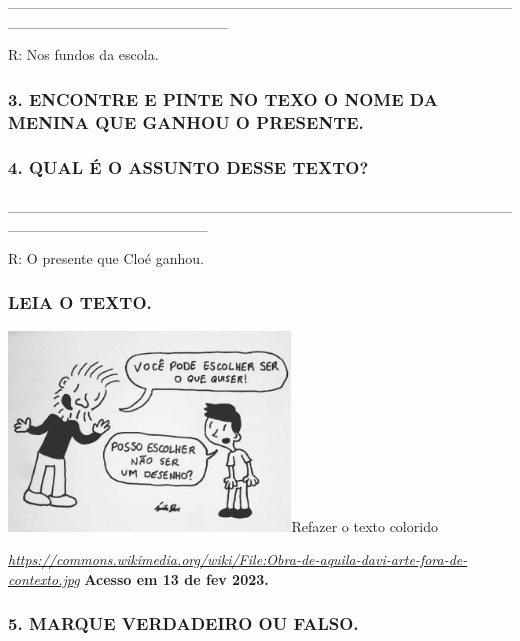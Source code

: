 \_\_\_\_\_\_\_\_\_\_\_\_\_\_\_\_\_\_\_\_\_\_\_\_\_\_\_\_\_\_\_\_\_\_\_\_\_\_\_\_\_\_\_\_\_\_\_\_\_\_\_\_\_\_\_\_\_\_\_\_\_\_\_\_\_\_\_\_\_

R: Nos fundos da escola.

\subsubsection{3. ENCONTRE E PINTE NO TEXO O NOME DA MENINA QUE GANHOU O
PRESENTE.}\label{encontre-e-pinte-no-texo-o-nome-da-menina-que-ganhou-o-presente.}

\subsubsection{4. QUAL É O ASSUNTO DESSE
TEXTO?}\label{qual-uxe9-o-assunto-desse-texto}

\_\_\_\_\_\_\_\_\_\_\_\_\_\_\_\_\_\_\_\_\_\_\_\_\_\_\_\_\_\_\_\_\_\_\_\_\_\_\_\_\_\_\_\_\_\_\_\_\_\_\_\_\_\_\_\_\_\_\_\_\_\_\_\_\_\_\_

R: O presente que Cloé ganhou.

\subsubsection{LEIA O TEXTO.}\label{leia-o-texto.-1}

\includegraphics[width=2.95254in,height=2.09138in]{media/image164.jpg}Refazer
o texto colorido

\href{https://commons.wikimedia.org/wiki/File:Obra-de-aquila-davi-arte-fora-de-contexto.jpg}{\emph{https://commons.wikimedia.org/wiki/File:Obra-de-aquila-davi-arte-fora-de-contexto.jpg}}
\textbf{Acesso em 13 de fev 2023.}

\subsubsection{5. MARQUE VERDADEIRO OU
FALSO.}\label{marque-verdadeiro-ou-falso.}

